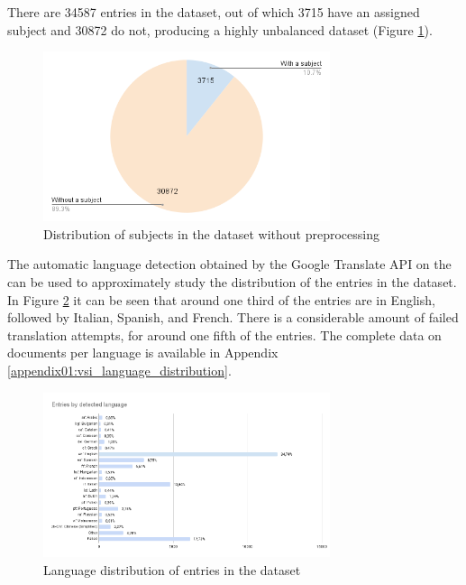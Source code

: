There are 34587 entries in the dataset, out of which 3715 have an assigned subject and 30872 do not, producing a highly unbalanced dataset (Figure \ref{fig:04_naive_positives_and_negatives}). 

\begin{figure}
    \centering
    \includegraphics[width=0.75\textwidth]{Figures/04/naive_positives_and_negatives_chart.png}
    \caption{Distribution of subjects in the \VSI{} dataset without preprocessing}
    \label{fig:04_naive_positives_and_negatives}
\end{figure}

The automatic language detection obtained by the Google Translate API  on the \trafilaturaTitle{} can be used to approximately study the distribution of the entries in the dataset. In Figure \ref{fig:04_vsi_language_distribution} it can be seen that around one third of the entries are in English, followed by Italian, Spanish, and French. There is a considerable amount of failed translation attempts, for around one fifth of the entries. The complete data on documents per language is available in Appendix \ref{appendix01:vsi_language_distribution}.
 
\begin{figure}
    \centering
    \includegraphics[width=0.75\textwidth]{Figures/04/Entries by detected language.png}
    \caption{Language distribution of entries in the \VSI{} dataset}
    \label{fig:04_vsi_language_distribution}
\end{figure}


